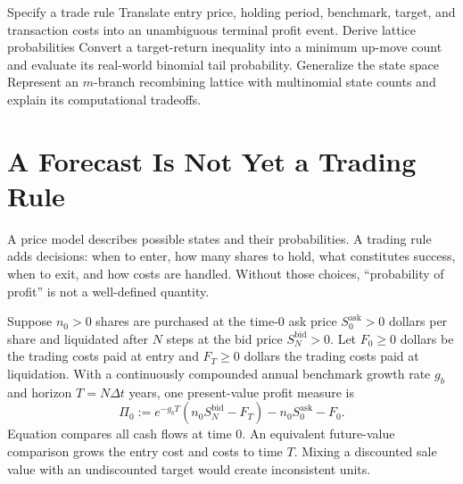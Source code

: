 \documentclass[11pt]{article}
\begin{document}

\learningobjectives
  {Specify a trade rule}
  {Translate entry price, holding period, benchmark, target, and transaction costs into an unambiguous terminal profit event.}
  {Derive lattice probabilities}
  {Convert a target-return inequality into a minimum up-move count and evaluate its real-world binomial tail probability.}
  {Generalize the state space}
  {Represent an $m$-branch recombining lattice with multinomial state counts and explain its computational tradeoffs.}

\section{A Forecast Is Not Yet a Trading Rule}

A price model describes possible states and their probabilities. A trading rule adds decisions: when to enter, how many shares to hold, what constitutes success, when to exit, and how costs are handled. Without those choices, ``probability of profit'' is not a well-defined quantity.

Suppose $n_0>0$ shares are purchased at the time-0 ask price $S_0^{\mathrm{ask}}>0$ dollars per share and liquidated after $N$ steps at the bid price $S_N^{\mathrm{bid}}>0$. Let $F_0\geq0$ dollars be the trading costs paid at entry and $F_T\geq0$ dollars the trading costs paid at liquidation. With a continuously compounded annual benchmark growth rate $g_b$ and horizon $T=N\Delta t$ years, one present-value profit measure is
\begin{equation}
  \label{eq:trade-npv}
  \Pi_0:=e^{-g_bT}\left(n_0S_N^{\mathrm{bid}}-F_T\right)
  -n_0S_0^{\mathrm{ask}}-F_0.
\end{equation}
Equation  compares all cash flows at time 0. An equivalent future-value comparison grows the entry cost and costs to time $T$. Mixing a discounted sale value with an undiscounted target would create inconsistent units.
\end{document}
